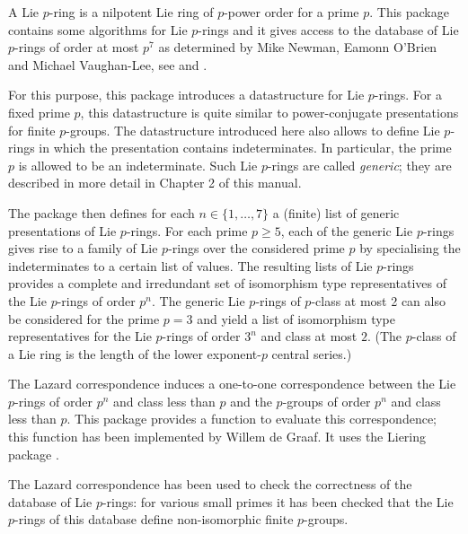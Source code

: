 

A Lie $p$-ring is a nilpotent Lie ring of $p$-power order for a prime $p$. 
This package contains some algorithms for Lie $p$-rings and it gives access 
to the database of Lie $p$-rings of order at most $p^7$ as determined by 
Mike Newman, Eamonn O'Brien and Michael Vaughan-Lee, see \cite{NOV04} and 
\cite{OVL05}.
\medskip

For this purpose, this package introduces a datastructure for Lie $p$-rings. 
For a fixed prime $p$, this datastructure is quite similar to power-conjugate 
presentations for finite $p$-groups. The datastructure introduced here also 
allows to define Lie $p$-rings in which the presentation contains 
indeterminates. In particular, the prime $p$ is allowed to be an 
indeterminate. Such Lie $p$-rings are called {\it generic}; they are 
described in more detail in Chapter 2 of this manual.
\medskip

The package then defines for each $n \in \{1, \ldots, 7\}$ a (finite) list 
of generic presentations of Lie $p$-rings. For each prime $p \geq 5$, each 
of the generic Lie $p$-rings gives rise to a family of Lie $p$-rings over 
the considered prime $p$ by specialising the indeterminates to a certain list 
of values. The resulting lists of Lie $p$-rings provides a complete and 
irredundant set of isomorphism type representatives of the Lie $p$-rings of 
order $p^n$. The generic Lie $p$-rings of $p$-class at most 2 can also be 
considered for the prime $p=3$ and yield a list of isomorphism type 
representatives for the Lie $p$-rings of order $3^n$ and class at most $2$.
(The $p$-class of a Lie ring is the length of the lower exponent-$p$ central
series.)
\medskip

The Lazard correspondence induces a one-to-one correspondence between the
Lie $p$-rings of order $p^n$ and class less than $p$ and the $p$-groups of 
order $p^n$ and class less than $p$. This package provides a function to 
evaluate this correspondence; this function has been implemented by Willem
de Graaf. It uses the Liering package \cite{CdG10}. 
\medskip

The Lazard correspondence has been used to check the correctness of the
database of Lie $p$-rings: for various small primes it has been checked
that the Lie $p$-rings of this database define non-isomorphic finite 
$p$-groups.


